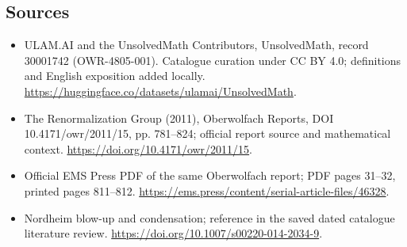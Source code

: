 \documentclass[11pt]{article}
\begin{document}
\subsection{Sources}
\begin{itemize}
\item[\hypertarget{source:30001742:1}{S1}] ULAM.AI and the UnsolvedMath Contributors, UnsolvedMath, record 30001742 (OWR-4805-001). Catalogue curation under CC BY 4.0; definitions and English exposition added locally.
\url{https://huggingface.co/datasets/ulamai/UnsolvedMath}.
\item[\hypertarget{source:30001742:2}{S2}] The Renormalization Group (2011), Oberwolfach Reports, DOI 10.4171/owr/2011/15, pp. 781--824; official report source and mathematical context.
\url{https://doi.org/10.4171/owr/2011/15}.
\item[\hypertarget{source:30001742:3}{S3}] Official EMS Press PDF of the same Oberwolfach report; PDF pages 31--32, printed pages 811--812.
\url{https://ems.press/content/serial-article-files/46328}.
\item[\hypertarget{source:30001742:4}{S4}] Nordheim blow-up and condensation; reference in the saved dated catalogue literature review.
\url{https://doi.org/10.1007/s00220-014-2034-9}.
\end{itemize}
\label{end:30001742}
\end{document}
